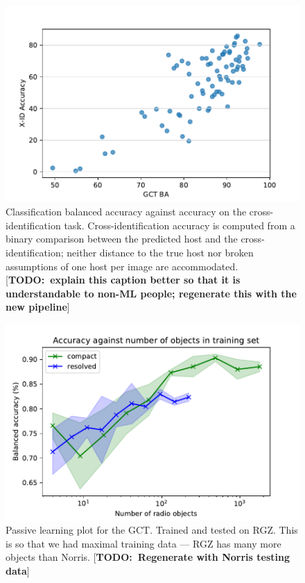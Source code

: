 \documentclass[fleqn,usenatbib,usedcolumn]{mnras}
\newcommand{\todo}[1]{ {\color{red}[{\bf TODO:~{#1}}]} }
\begin{document}
  \begin{figure}
  \centering
  \includegraphics[width=\columnwidth]{gct-to-xid.pdf}
  \caption{Classification balanced accuracy against accuracy on the
  cross-identification task. Cross-identification accuracy is computed from a
  binary comparison between the predicted host and the \citet{norris06}
  cross-identification; neither distance to the true host nor broken assumptions
  of one host per image are accommodated. \todo{explain this caption better
  so that it is understandable to non-ML people; regenerate this with the new
  pipeline}\label{fig:gct-to-xid}}
  \end{figure}


  \begin{figure}
  \centering
  \includegraphics[width=\columnwidth]{passive.pdf}
  \caption{Passive learning plot for the GCT. Trained and tested on RGZ.
    This is so that we had maximal training data --- RGZ has many more
    objects than Norris. \todo{Regenerate with Norris testing data}
    \label{fig:passive}}
  \end{figure}
\end{document}
